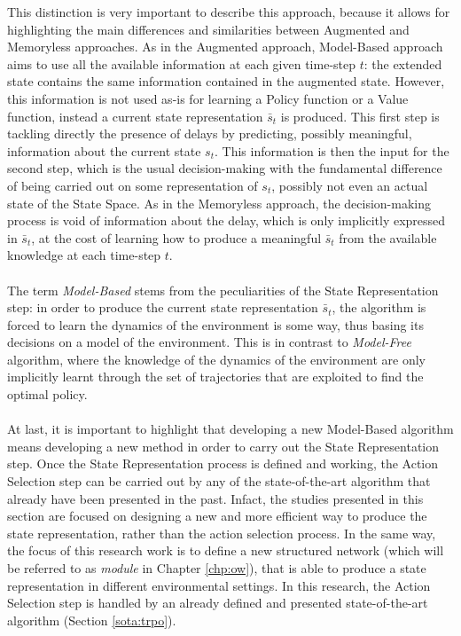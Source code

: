                 This distinction is very important to describe this approach, because it allows for highlighting the main differences and similarities between Augmented and Memoryless approaches. As in the Augmented approach, Model-Based approach aims to use all the available information at each given time-step $t$: the extended state contains the same information contained in the augmented state. However, this information is not used as-is for learning a Policy function or a Value function, instead a current state representation $\bar{s}_t$ is produced. This first step is tackling directly the presence of delays by predicting, possibly meaningful, information about the current state $s_t$. This information is then the input for the second step, which is the usual decision-making with the fundamental difference of being carried out on some representation of $s_t$, possibly not even an actual state of the State Space. As in the Memoryless approach, the decision-making process is void of information about the delay, which is only implicitly expressed in $\bar{s}_t$, at the cost of learning how to produce a meaningful $\bar{s}_t$ from the available knowledge at each time-step $t$.
                \\\\
                The term \textit{Model-Based} stems from the peculiarities of the State Representation step: in order to produce the current state representation $\bar{s}_t$, the algorithm is forced to learn the dynamics of the environment is some way, thus basing its decisions on a model of the environment. This is in contrast to \textit{Model-Free} algorithm, where the knowledge of the dynamics of the environment are only implicitly learnt through the set of trajectories that are exploited to find the optimal policy.
                \\\\
                At last, it is important to highlight that developing a new Model-Based algorithm means developing a new method in order to carry out the State Representation step. Once the State Representation process is defined and working, the Action Selection step can be carried out by any of the state-of-the-art algorithm that already have been presented in the past. Infact, the studies presented in this section are focused on designing a new and more efficient way to produce the state representation, rather than the action selection process. In the same way, the focus of this research work is to define a new structured network (which will be referred to as \textit{module} in Chapter \ref{chp:ow}), that is able to produce a state representation in different environmental settings. In this research, the Action Selection step is handled by an already defined and presented state-of-the-art algorithm (Section \ref{sota:trpo}).
                
